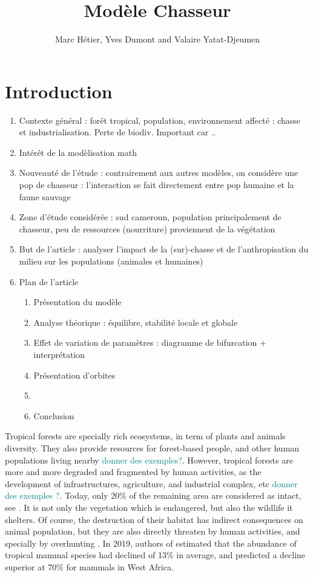 \documentclass{article}
\title{Modèle Chasseur}
\author{Marc Hétier, Yves Dumont  and Valaire Yatat-Djeumen}
\newcommand{\marc}[1]{\textcolor{teal}{#1}}
\begin{document}
\maketitle

\section{Introduction}

\begin{enumerate}
\item Contexte général : forêt tropical, population, environnement affecté : chasse et industrialisation. Perte de biodiv. Important car ..
\item  Intérêt de la modèlisation math
\item Nouveauté de l'étude : contrairement aux autres modèles, on considère une pop de chasseur : l'interaction se fait directement entre pop humaine et la faune sauvage
\item Zone d'étude considérée : sud cameroun, population principalement de chasseur, peu de ressources (nourriture) proviennent de la végétation
\item But de l'article : analyser l'impact de la (sur)-chasse et de l'anthropisation du milieu sur les populations (animales et humaines)
\item Plan de l'article

\begin{enumerate}
\item Présentation du modèle
\item Analyse théorique : équilibre, stabilité locale et globale
\item Effet de variation de paramètres : diagramme de bifurcation + interprétation
\item Présentation d'orbites
\item 
\item Conclusion
\end{enumerate}
\end{enumerate}

Tropical forests are specially rich ecosystems, in term of plants and animals diversity. They also provide resources for forest-based people, and other human populations living nearby \marc{donner des exemples?}. However, tropical forests are more and more degraded and fragmented by human activities, as the development of infrastructures, agriculture, and industrial complex, etc \marc{donner des exemples ?}. Today, only 20\% of the remaining area are considered as intact, see \cite{benitez-lopez_intact_2019}. It is not only the vegetation which is endangered, but also the wildlife it shelters. Of course, the destruction of their habitat has indirect consequences on animal population, but they are also directly threaten by human activities, and specially by overhunting \cite{wilkie_empty_2011, benitez-lopez_intact_2019}. In 2019, authors of \cite{benitez-lopez_intact_2019} estimated that the abundance of tropical mammal species had declined of 13\% in average, and predicted a decline superior at 70\% for mammals in West Africa. 
\end{document}
